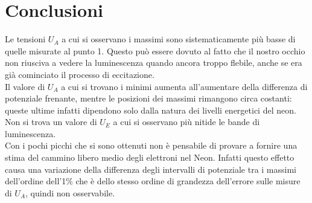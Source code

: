 \documentclass[10pt,a4paper]{article}
\begin{document}
\section{Conclusioni}
Le tensioni $U_A$ a cui si osservano i massimi sono sistematicamente più basse di quelle misurate al punto 1. Questo può essere dovuto al fatto che il nostro occhio non riusciva a vedere la luminescenza quando ancora troppo flebile, anche se era già cominciato il processo di eccitazione.\\
Il valore di $U_A$ a cui si trovano i minimi aumenta all'aumentare della differenza di potenziale frenante, mentre le posizioni dei massimi rimangono circa costanti: queste ultime infatti dipendono solo dalla natura dei livelli energetici del neon.\\
Non si trova un valore di $U_E$ a cui si osservano più nitide le bande di luminescenza.\\
Con i pochi picchi che si sono ottenuti non è pensabile di provare a fornire una stima del cammino libero medio degli elettroni nel Neon. Infatti questo effetto causa una variazione della differenza degli intervalli di potenziale tra i massimi dell'ordine dell'1\% che è dello stesso ordine di grandezza dell'errore sulle misure di $U_A$, quindi non osservabile.
\end{document}
